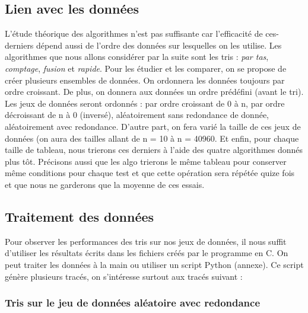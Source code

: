 \documentclass[11pt,a4paper]{article}
\begin{document}
\subsection{Lien avec les données}
L’étude théorique des algorithmes n’est pas suffisante car l’efficacité de ces-derniers dépend
aussi de l’ordre des données sur lesquelles on les utilise. Les algorithmes que nous allons considérer
par la suite sont les tris : \textit{par tas}, \textit{comptage}, \textit{fusion} et \textit{rapide}.
Pour les étudier et les comparer, on se propose de créer plusieurs ensembles de données.
On ordonnera les données toujours par ordre croissant. De plus, on donnera aux données un
ordre prédéfini (avant le tri). Les jeux de données seront ordonnés : par ordre croissant de 0 à n,
par ordre décroissant de n à 0 (inversé), aléatoirement sans redondance de donnée, aléatoirement
avec redondance. D’autre part, on fera varié la taille de ces jeux de données (on
aura des tailles allant de n = 10 à n = 40960. Et enfin, pour chaque taille de tableau, nous trierons ces derniers
à l'aide des quatre algorithmes donnés plus tôt. Précisons aussi que les algo trierons le même tableau pour conserver
même conditions pour chaque test et que cette opération sera répétée quize fois et que nous ne garderons que la moyenne de ces essais.

\subsection{Traitement des données}
Pour observer les performances des tris sur nos jeux de données, il nous suffit d’utiliser les
résultats écrits dans les fichiers créés par le programme en C. On peut traiter les données à la main
ou utiliser un script Python (annexe). Ce script génère plusieurs tracés, on s’intéresse surtout aux tracés suivant :

\subsubsection{Tris sur le jeu de données aléatoire avec redondance}
\end{document}
